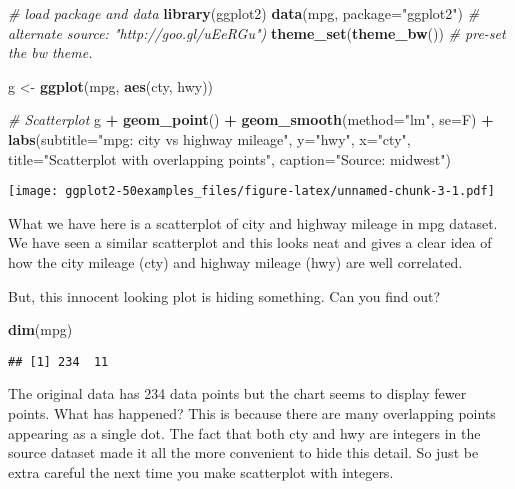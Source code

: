 \documentclass[a4paper]{article}
\newenvironment{Shaded}{\begin{snugshade}}{\end{snugshade}}
\newcommand{\KeywordTok}[1]{\textcolor[rgb]{0.13,0.29,0.53}{\textbf{#1}}}
\newcommand{\DataTypeTok}[1]{\textcolor[rgb]{0.13,0.29,0.53}{#1}}
\newcommand{\StringTok}[1]{\textcolor[rgb]{0.31,0.60,0.02}{#1}}
\newcommand{\CommentTok}[1]{\textcolor[rgb]{0.56,0.35,0.01}{\textit{#1}}}
\newcommand{\OperatorTok}[1]{\textcolor[rgb]{0.81,0.36,0.00}{\textbf{#1}}}
\newcommand{\NormalTok}[1]{#1}
\begin{document}
\begin{Shaded}
\begin{Highlighting}[]
\CommentTok{# load package and data}
\KeywordTok{library}\NormalTok{(ggplot2)}
\KeywordTok{data}\NormalTok{(mpg, }\DataTypeTok{package=}\StringTok{"ggplot2"}\NormalTok{) }\CommentTok{# alternate source: "http://goo.gl/uEeRGu")}
\KeywordTok{theme_set}\NormalTok{(}\KeywordTok{theme_bw}\NormalTok{())  }\CommentTok{# pre-set the bw theme.}

\NormalTok{g <-}\StringTok{ }\KeywordTok{ggplot}\NormalTok{(mpg, }\KeywordTok{aes}\NormalTok{(cty, hwy))}

\CommentTok{# Scatterplot}
\NormalTok{g }\OperatorTok{+}\StringTok{ }\KeywordTok{geom_point}\NormalTok{() }\OperatorTok{+}\StringTok{ }
\StringTok{  }\KeywordTok{geom_smooth}\NormalTok{(}\DataTypeTok{method=}\StringTok{"lm"}\NormalTok{, }\DataTypeTok{se=}\NormalTok{F) }\OperatorTok{+}
\StringTok{  }\KeywordTok{labs}\NormalTok{(}\DataTypeTok{subtitle=}\StringTok{"mpg: city vs highway mileage"}\NormalTok{, }
       \DataTypeTok{y=}\StringTok{"hwy"}\NormalTok{, }
       \DataTypeTok{x=}\StringTok{"cty"}\NormalTok{, }
       \DataTypeTok{title=}\StringTok{"Scatterplot with overlapping points"}\NormalTok{, }
       \DataTypeTok{caption=}\StringTok{"Source: midwest"}\NormalTok{)}
\end{Highlighting}
\end{Shaded}

\texttt{[image: ggplot2-50examples\_files/figure-latex/unnamed-chunk-3-1.pdf]}
\newpage

What we have here is a scatterplot of city and highway mileage in mpg
dataset. We have seen a similar scatterplot and this looks neat and
gives a clear idea of how the city mileage (cty) and highway mileage
(hwy) are well correlated.

But, this innocent looking plot is hiding something. Can you find out?

\begin{Shaded}
\begin{Highlighting}[]
\KeywordTok{dim}\NormalTok{(mpg)}
\end{Highlighting}
\end{Shaded}

\begin{verbatim}
## [1] 234  11
\end{verbatim}

The original data has 234 data points but the chart seems to display
fewer points. What has happened? This is because there are many
overlapping points appearing as a single dot. The fact that both cty and
hwy are integers in the source dataset made it all the more convenient
to hide this detail. So just be extra careful the next time you make
scatterplot with integers.
\end{document}
